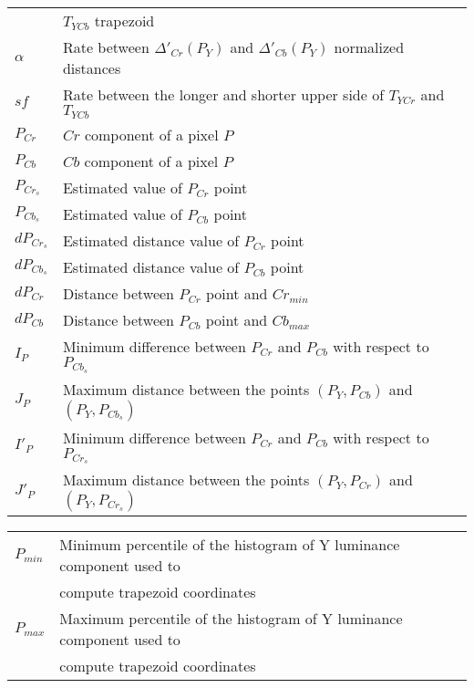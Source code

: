 \documentclass[12pt,twoside,a4paper]{book}
\theoremstyle{plain}
\theoremstyle{definition}
\begin{document}
\begin{tabular}{ll}
                       &$T_{YCb}$ trapezoid \\
    $\alpha$    & Rate between $\Delta'_{Cr}(P_Y)$ and $\Delta'_{Cb}(P_Y)$ normalized distances \\
    $sf$        & Rate between the longer and shorter upper side of $T_{YCr}$ and $T_{YCb}$ \\
    $P_{Cr}$    & $Cr$ component of a pixel $P$ \\
    $P_{Cb}$    & $Cb$ component of a pixel $P$ \\
    $P_{Cr_{s}}$& Estimated value of $P_{Cr}$ point \\
    $P_{Cb_{s}}$& Estimated value of $P_{Cb}$ point \\
    $dP_{Cr_{s}}$& Estimated distance value of $P_{Cr}$ point \\
    $dP_{Cb_{s}}$& Estimated distance value of $P_{Cb}$ point \\
    $dP_{Cr}$   & Distance between $P_{Cr}$ point and $Cr_{min}$ \\
    $dP_{Cb}$   & Distance between $P_{Cb}$ point and $Cb_{max}$ \\
    $I_P$       & Minimum difference between $P_{Cr}$ and $P_{Cb}$ with respect to $P_{Cb_s}$ \\
    $J_P$       & Maximum distance between the points $(P_Y, P_{Cb})$ and $(P_Y, P_{Cb_s})$ \\
    $I'_P$      & Minimum difference between $P_{Cr}$ and $P_{Cb}$ with respect to $P_{Cr_s}$ \\
    $J'_P$      & Maximum distance between the points $(P_Y, P_{Cr})$ and $(P_Y, P_{Cr_s})$ \\
\end{tabular}
\clearpage
\begin{tabular}{ll}
    $P_{min}$   & Minimum percentile of the histogram of Y luminance component used to \\
                & compute trapezoid coordinates \\
    $P_{max}$   & Maximum percentile of the histogram of Y luminance component used to \\
                & compute trapezoid coordinates \\
\end{tabular}
\listoffigures            
\listoftables            

\mainmatter
\end{document}
